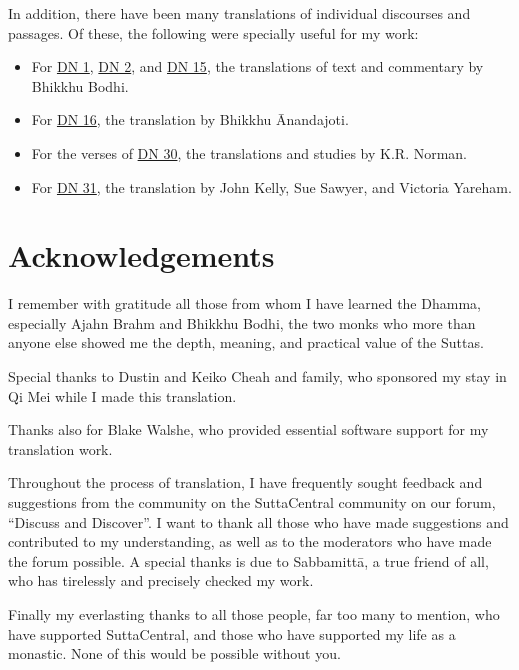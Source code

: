 \documentclass[12pt,openany]{book}%
\begin{document}
In addition, there have been many translations of individual discourses and passages. Of these, the following were specially useful for my work:

\begin{itemize}%
\item For \href{https://suttacentral.net/dn1}{DN 1}, \href{https://suttacentral.net/dn2}{DN 2}, and \href{https://suttacentral.net/dn15}{DN 15}, the translations of text and commentary by Bhikkhu Bodhi.%
\item For \href{https://suttacentral.net/dn16}{DN 16}, the translation by Bhikkhu Ānandajoti.%
\item For the verses of \href{https://suttacentral.net/dn30}{DN 30}, the translations and studies by K.R. Norman.%
\item For \href{https://suttacentral.net/dn31}{DN 31}, the translation by John Kelly, Sue Sawyer, and Victoria Yareham.%
\end{itemize}

%
\chapter*{Acknowledgements}

I remember with gratitude all those from whom I have learned the Dhamma, especially Ajahn Brahm and Bhikkhu Bodhi, the two monks who more than anyone else showed me the depth, meaning, and practical value of the Suttas.

Special thanks to Dustin and Keiko Cheah and family, who sponsored my stay in Qi Mei while I made this translation.

Thanks also for Blake Walshe, who provided essential software support for my translation work.

Throughout the process of translation, I have frequently sought feedback and suggestions from the community on the SuttaCentral community on our forum, “Discuss and Discover”. I want to thank all those who have made suggestions and contributed to my understanding, as well as to the moderators who have made the forum possible. A special thanks is due to \textsanskrit{Sabbamittā}, a true friend of all, who has tirelessly and precisely checked my work.

Finally my everlasting thanks to all those people, far too many to mention, who have supported SuttaCentral, and those who have supported my life as a monastic. None of this would be possible without you.
\end{document}
